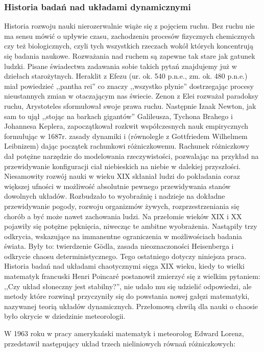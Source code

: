\documentclass[licencjacka]{pwr_wmat_praca_dyplomowa}
\theoremstyle{plain}
\numberwithin{theorem}{chapter}
\theoremstyle{definition}
\numberwithin{theorem}{chapter}
\begin{document}
\subsubsection{Historia badań nad układami dynamicznymi}
Historia rozwoju nauki nierozerwalnie wiąże się z pojęciem ruchu. Bez ruchu nie ma sensu mówić o upływie czasu, zachodzeniu procesów fizycznych chemicznych czy też biologicznych, czyli tych wszystkich rzeczach wokół których koncentrują się badania naukowe. Rozważania nad ruchem są zapewne tak stare jak gatunek ludzki. Pisane świadectwa zadawania sobie takich pytań znajdujemy już w dziełach starożytnych. Heraklit z Efezu (ur. ok. 540 p.n.e., zm. ok. 480 p.n.e.) miał powiedzieć ,,pantha rei'' co znaczy ,,wszystko płynie'' dostrzegając procesy nieustannych zmian w otaczającym nas świecie. Zenon z Elei rozważał paradoksy ruchu, Arystoteles sformułował swoje prawa ruchu. Następnie Izaak Newton, jak sam to ujął ,,stojąc na barkach gigantów'' Galileusza, Tychona Brahego i Johannesa Keplera, zapoczątkował rozkwit współczesnych nauk empirycznych formułując w 1687r. zasady dynamiki i (równolegle z Gottfriedem Wilhelmem Leibnizem) dając początek rachunkowi różniczkowemu. Rachunek różniczkowy dał potężne narzędzie do modelowania rzeczywistości, pozwalając na przykład na przewidywanie konfiguracji ciał niebieskich na niebie w dalekiej przyszłości. Niesamowity rozwój nauki w wieku XIX skłaniał ludzi do pokładania coraz większej ufności w możliwość absolutnie pewnego przewidywania stanów dowolnych układów. Rozbudzało to wyobraźnię i nadzieje na dokładne przewidywanie pogody, rozwoju organizmów żywych, rozprzestrzeniania się chorób a być może nawet zachowania ludzi. Na przełomie wieków XIX i XX pojawiły się potężne pęknięcia, niwecząc te ambitne wyobrażenia. Nastąpiły trzy odkrycia, wskazujące na immanentne ograniczenia w możliwościach badania świata. Były to: twierdzenie G\"odla, zasada nieoznaczoności Heisenberga i odkrycie chaosu deterministycznego. Tego ostatniego dotyczy niniejsza praca. Historia badań nad układami chaotycznymi sięga XIX wieku, kiedy to wielki matematyk francuski Henri Poincar\'e postanowił zmierzyć się z wielkim pytaniem: ,,Czy układ słoneczny jest stabilny?'', nie udało mu się udzielić odpowiedzi, ale metody które rozwinął przyczyniły się do powstania nowej gałęzi matematyki, nazywanej teorią układów dynamicznych. Przełomową chwilą dla nauki o chaosie było okrycie w dziedzinie meteorologii.

W 1963 roku w pracy \cite{lorenz1963deterministic} amerykański matematyk i meteorolog Edward Lorenz, przedstawił następujący układ trzech nieliniowych równań różniczkowych:
\end{document}
